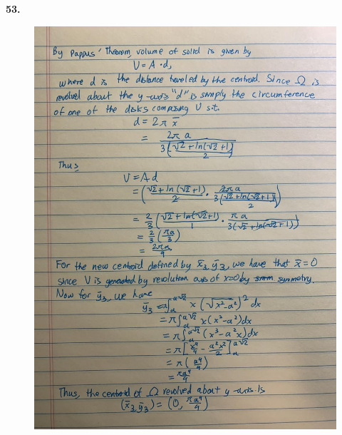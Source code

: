 \documentclass{article}
\begin{document}
    \pagebreak
    \textbf{53.}
    
    \begin{figure}[hbt!]
        \centering
        \includegraphics[scale=0.35]{omega5}
    \end{figure}


    
\end{document}
